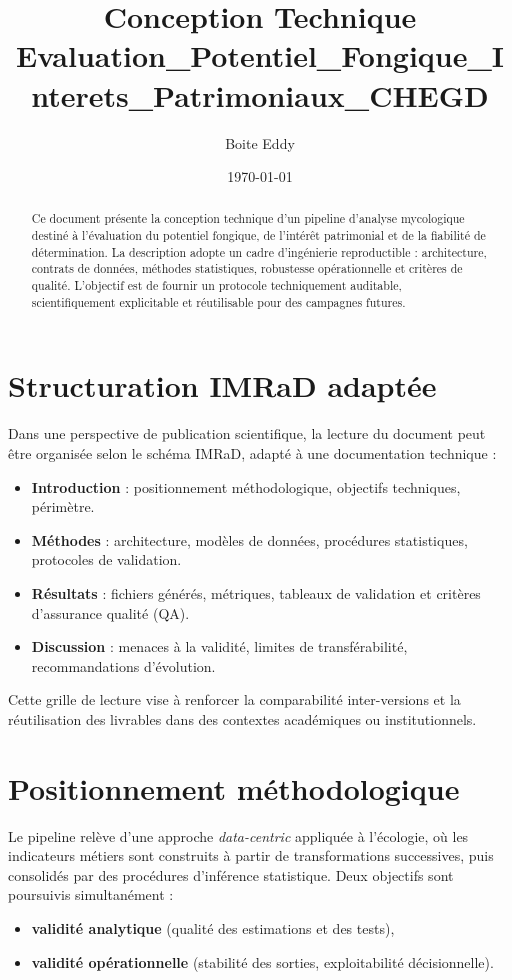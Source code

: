 \documentclass[11pt,a4paper]{article}
\title{Conception Technique\\
\large Evaluation\_Potentiel\_Fongique\_Interets\_Patrimoniaux\_CHEGD}
\author{Boite Eddy}
\date{\today}
\begin{document}
\maketitle

\begin{abstract}
Ce document présente la conception technique d'un pipeline d'analyse mycologique
destiné à l'évaluation du potentiel fongique, de l'intérêt patrimonial et de la fiabilité de détermination.
La description adopte un cadre d'ingénierie reproductible : architecture, contrats de données,
méthodes statistiques, robustesse opérationnelle et critères de qualité.
L'objectif est de fournir un protocole techniquement auditable, scientifiquement explicitable
et réutilisable pour des campagnes futures.
\end{abstract}
\tableofcontents
\newpage

\section{Structuration IMRaD adaptée}
Dans une perspective de publication scientifique, la lecture du document peut
être organisée selon le schéma IMRaD, adapté à une documentation technique :
\begin{itemize}[leftmargin=1.2cm]
  \item \textbf{Introduction} : positionnement méthodologique, objectifs techniques, périmètre.
  \item \textbf{Méthodes} : architecture, modèles de données, procédures statistiques, protocoles de validation.
  \item \textbf{Résultats} : fichiers générés, métriques, tableaux de validation et critères d'assurance qualité (QA).
  \item \textbf{Discussion} : menaces à la validité, limites de transférabilité, recommandations d'évolution.
\end{itemize}

Cette grille de lecture vise à renforcer la comparabilité inter-versions et
la réutilisation des livrables dans des contextes académiques ou institutionnels.

\section{Positionnement méthodologique}
Le pipeline relève d'une approche \textit{data-centric} appliquée à l'écologie,
où les indicateurs métiers sont construits à partir de transformations successives,
puis consolidés par des procédures d'inférence statistique.
Deux objectifs sont poursuivis simultanément :
\begin{itemize}[leftmargin=1.2cm]
  \item \textbf{validité analytique} (qualité des estimations et des tests),
  \item \textbf{validité opérationnelle} (stabilité des sorties, exploitabilité décisionnelle).
\end{itemize}
\end{document}
